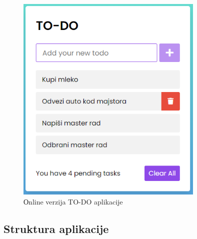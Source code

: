 \documentclass[12pt,oneside]{memoir}
\begin{document}
\begin{figure}[!ht]
  \centering
  \includegraphics[width=0.8\textwidth]{slike/todo-app-online.PNG}
  \caption{Оnline verzija TO-DO aplikacije}
  \label{fig:todo-app}
\end{figure}
\subsection{Struktura aplikacije}
\end{document}
